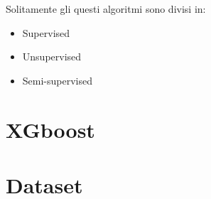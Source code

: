 Solitamente gli questi algoritmi sono divisi in:


\begin{itemize}
    \item Supervised
    \item Unsupervised 
    \item Semi-supervised
\end{itemize}




\section{XGboost}


\section{Dataset}


